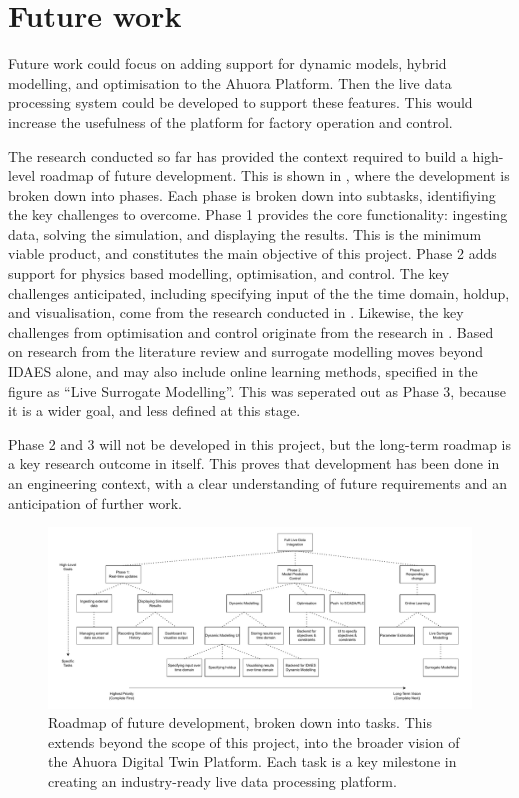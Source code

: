 \section{Future work}
Future work could focus on adding support for dynamic models, hybrid modelling, and optimisation to the Ahuora Platform. Then the live data processing system could be developed to support these features. 
This would increase the usefulness of the platform for factory operation and control. 


The research conducted so far has provided the context required to build a high-level roadmap of future development. This is shown in , where the development is broken down into phases. Each phase is broken down into subtasks, identifiying the key challenges to overcome.
Phase 1 provides the core functionality: ingesting data, solving the simulation, and displaying the results. This is the minimum viable product, and constitutes the main objective of this project. Phase 2 adds support for physics based modelling, optimisation, and control. The key challenges anticipated, including specifying input of the the time domain, holdup, and visualisation, come from the research conducted in . Likewise, the key challenges from optimisation and control originate from the research in . Based on research from the literature review and  surrogate modelling moves beyond IDAES alone, and may also include online learning methods, specified in the figure as ``Live Surrogate Modelling''. This was seperated out as Phase 3, because it is a wider goal, and less defined at this stage. 

Phase 2 and 3 will not be developed in this project, but the long-term roadmap is a key research outcome in itself. This proves that development has been done in an engineering context, with a clear understanding of future requirements and an anticipation of further work.

\begin{landscape}
    \begin{figure}
        \centering
        \includegraphics[width=1.5\textwidth]{roadmap.pdf}
        \caption{Roadmap of future development, broken down into tasks. This extends beyond the scope of this project, into the broader vision of the Ahuora Digital Twin Platform. Each task is a key milestone in creating an industry-ready live data processing platform.}
        \label{fig:development_flowchart}
    \end{figure}
\end{landscape}

